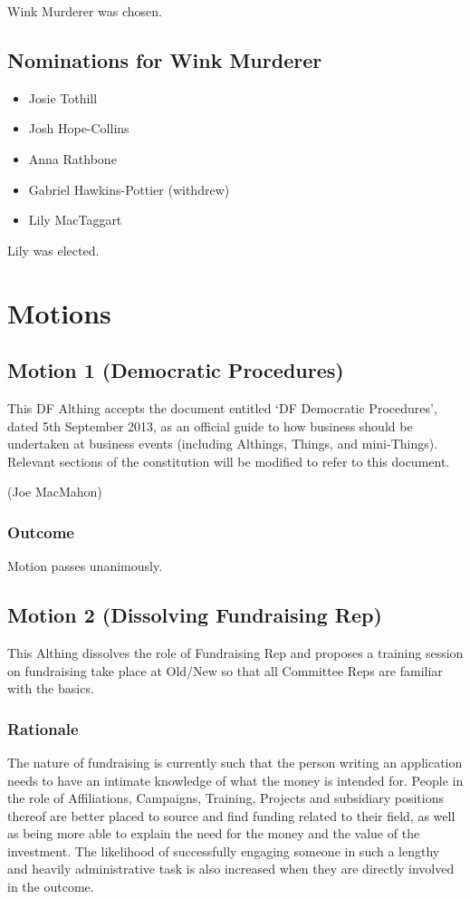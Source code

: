 \documentclass[a4paper, 11pt]{article} %
\begin{document}
Wink Murderer was chosen.

\subsection{Nominations for Wink Murderer}
\begin{itemize}
\item Josie Tothill
\item Josh Hope-Collins
\item Anna Rathbone
\item Gabriel Hawkins-Pottier (withdrew)
\item Lily MacTaggart
\end{itemize}

Lily was elected.

\section{Motions}
\subsection{Motion 1 (Democratic Procedures)}
This DF Althing accepts the document entitled `DF Democratic Procedures', dated 5th September 2013, as an official guide to how business should be undertaken at business events (including Althings, Things, and mini-Things).  Relevant sections of the constitution will be modified to refer to this document.

(Joe MacMahon)

\subsubsection{Outcome}
Motion passes unanimously.

\subsection{Motion 2 (Dissolving Fundraising Rep)}

This Althing dissolves the role of Fundraising Rep and proposes a training session on fundraising take place at Old/New so that all Committee Reps are familiar with the basics.

\subsubsection{Rationale}

The nature of fundraising is currently such that the person
writing an application needs to have an intimate knowledge of what the
money is intended for.  People in the role of Affiliations, Campaigns,
Training, Projects and subsidiary positions thereof are better placed to
source and find funding related to their field, as well as being more
able to explain the need for the money and the value of the investment.  
The likelihood of successfully engaging someone in such a lengthy and
heavily administrative task is also increased when they are directly
involved in the outcome.
\end{document}
